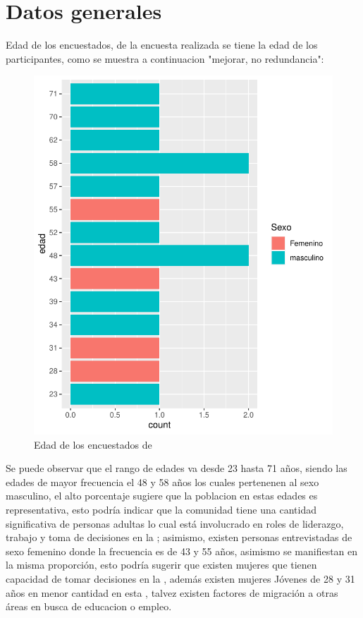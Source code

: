 \documentclass[12pt]{article}\usepackage[]{graphicx}\usepackage[]{xcolor}
\makeatletter
\def\maxwidth{ %
  \ifdim\Gin@nat@width>\linewidth
    \linewidth
  \else
    \Gin@nat@width
  \fi
}
\newenvironment{knitrout}{}{} %
\makeatother
\begin{document}
	\section{Datos generales}
	Edad de los encuestados, de la encuesta realizada se tiene la edad de los participantes, como se muestra a continuacion "mejorar, no redundancia":
	\begin{figure}[H]
	\centering
\begin{knitrout}
\color{fgcolor}
\includegraphics[width=\maxwidth]{figure/dos-1} 
\end{knitrout}
             	
	\caption{Edad de los encuestados de \comunidad}
	\end{figure}
	
Se puede observar que el rango de edades va desde 23 hasta 71 años, siendo las edades de mayor frecuencia el 48 y 58 años los cuales pertenenen al sexo masculino, el alto porcentaje sugiere que la poblacion en estas edades es representativa, esto podría indicar que la comunidad tiene una cantidad significativa de personas adultas lo cual está involucrado en roles de liderazgo, trabajo y toma de decisiones en la \comunidad; asimismo, existen personas entrevistadas de sexo femenino donde la frecuencia es de 43 y 55 años, asimismo se manifiestan en la misma proporción, esto podría sugerir que existen mujeres que tienen capacidad de tomar decisiones en la \comunidad, además existen mujeres Jóvenes de 28 y 31 años en menor cantidad en esta \comunidad, talvez existen factores de migración a otras áreas en busca de educacion o empleo.
\end{document}
